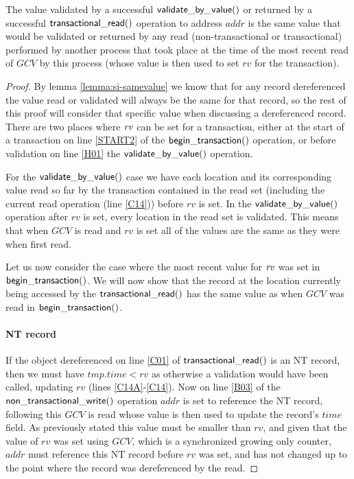 \begin{lemma}
\label{lemma:si-rvvalid}
The value validated by a successful $\sf{validate\_by\_value}()$ or returned by a successful
$\sf{transactional\_read}()$ operation to address $\mathit{addr}$ is the same
value that would be validated or returned by any read (non-transactional or transactional) performed by another process that took place
at the time of the most recent read of $\mathit{GCV}$ by this process (whose value is then used to set $\mathit{rv}$ for the transaction).
\end{lemma}
\begin{proof}
By lemma \ref{lemma:si-samevalue} we know that for any record dereferenced the value read or validated will
always be the same for that record, so the rest of this proof will consider that specific value when discussing
a dereferenced record.
There are two places where $\ms{rv}$ can be set for a transaction, either at the start of a transaction on line \ref{START2} of the
$\sf{begin\_transaction}()$ operation, or before validation on line \ref{H01} the $\sf{validate\_by\_value}()$ operation.


For the $\sf{validate\_by\_value}()$ case we have each location and its corresponding value read so far by the transaction contained
in the read set (including the current read operation (line \ref{C14})) before $\mathit{rv}$ is set.
In the $\sf{validate\_by\_value}()$ operation after $\mathit{rv}$ is set, every location in the read set is
validated.
This means that when $\mathit{GCV}$ is read and $\mathit{rv}$ is set all of the values are the same as they were when first read.

Let us now consider the case where the most recent value for $\ms{rv}$ was set in $\sf{begin\_transaction}()$.
We will now show that the record at the location currently being accessed by the $\sf{transactional\_read}()$
has the same value as when $\mathit{GCV}$ was read in $\sf{begin\_transaction}()$.

\paragraph{NT record} If the object dereferenced on line \ref{C01} of $\sf{transactional\_read}()$ is an NT record, then we must have $\mathit{tmp.time} < \mathit{rv}$
as otherwise a validation would have been called, updating $\mathit{rv}$ (lines \ref{C14A}-\ref{C14}).
Now on line \ref{B03} of the $\sf{non\_transactional\_write}()$ operation $\mathit{addr}$ is set to reference the NT record, following this
$\mathit{GCV}$ is read whose value is then used to update the record's $\mathit{time}$ field.
As previously stated this value must be smaller than $\mathit{rv}$, and given that the value of $\mathit{rv}$
was set using $\mathit{GCV}$, which is a synchronized growing only counter, $\mathit{addr}$ must reference
this NT record before $\mathit{rv}$ was set, and has not changed up to the point where the record was dereferenced by the read.


\end{proof}
